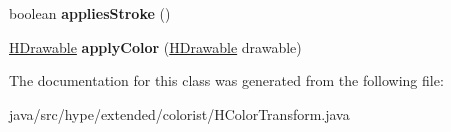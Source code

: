 \begin{DoxyCompactItemize}
\item 
\hypertarget{classhype_1_1extended_1_1colorist_1_1_h_color_transform_a165d3e32d76db84358f2d636fa76aeb4}{boolean {\bfseries applies\-Stroke} ()}\label{classhype_1_1extended_1_1colorist_1_1_h_color_transform_a165d3e32d76db84358f2d636fa76aeb4}

\item 
\hypertarget{classhype_1_1extended_1_1colorist_1_1_h_color_transform_ad2035984cdbf4309bbea988610fffadf}{\hyperlink{classhype_1_1core_1_1drawable_1_1_h_drawable}{H\-Drawable} {\bfseries apply\-Color} (\hyperlink{classhype_1_1core_1_1drawable_1_1_h_drawable}{H\-Drawable} drawable)}\label{classhype_1_1extended_1_1colorist_1_1_h_color_transform_ad2035984cdbf4309bbea988610fffadf}

\end{DoxyCompactItemize}


The documentation for this class was generated from the following file\-:\begin{DoxyCompactItemize}
\item 
java/src/hype/extended/colorist/H\-Color\-Transform.\-java\end{DoxyCompactItemize}
